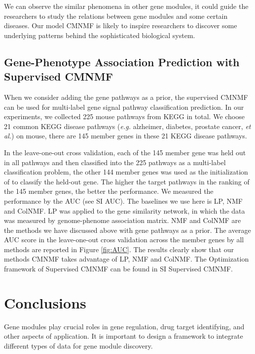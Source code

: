 \documentclass{bmcart}
\begin{document}
 We can observe the similar phenomena in other gene modules, it could guide the researchers to study the relations between gene modules and some certain diseases. Our model CMNMF is likely to inspire researchers to discover some underlying patterns behind the sophisticated biological system.
\subsection*{\textbf{Gene-Phenotype Association Prediction with Supervised CMNMF}}
 When we consider adding the gene pathways as a prior, the supervised CMNMF can be used for multi-label gene signal pathway classification prediction. In our experiments, we collected 225 mouse pathways from KEGG in total. We choose 21 common KEGG disease pathways (\emph{e.g.} alzheimer, diabetes, prostate cancer, \emph{et al.}) on mouse, there are 145 member genes in these 21 KEGG disease pathways.

 In the leave-one-out cross validation, each of the 145 member gene was held out in all pathways and then classified into the 225 pathways as a multi-label classification problem, the other 144 member genes was used as the initialization of to classify the held-out gene. The higher the target pathways in the ranking of the 145 member genes, the better the performance. We measured the performance by the AUC {\color{red} (see SI AUC)}. The baselines we use here is LP, NMF and ColNMF. LP was applied to the gene similarity network, in which the data was measured by genome-phenome association matrix. NMF and ColNMF are the methods we have discussed above with gene pathways as a prior. The average AUC score in the leave-one-out cross validation across the  member genes by all methods are reported in Figure \ref{fig:AUC}. The results clearly show that our methods CMNMF takes advantage of LP, NMF and ColNMF. The Optimization framework of Supervised CMNMF can be found in {\color{red}SI Supervised CMNMF}.

\section*{Conclusions}
Gene modules play crucial roles in gene regulation, drug target identifying, and other aspects of application.
It is important to design a framework to integrate different types of data for gene module discovery.
\end{document}
